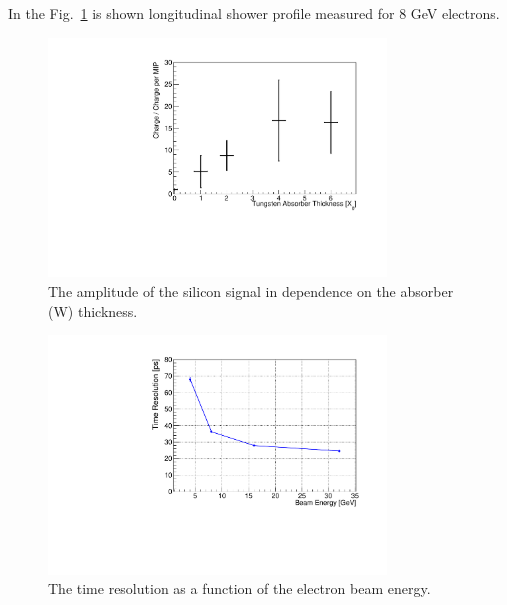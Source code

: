 \documentclass[12pt]{article}
\begin{document}
In the Fig.~\ref{fig:MIPVsAbsorberAt8GeV} is shown longitudinal shower profile
measured for 8 GeV electrons. 

\begin{figure}[htbp] 
\centering
\includegraphics[width=0.8\textwidth]{plots/MIPVsAbsorberAt8GeV.pdf} 
\caption{The amplitude of the silicon signal in dependence on the absorber (W) thickness.} 
\label{fig:MIPVsAbsorberAt8GeV} 
\end{figure} 


\begin{figure}[htbp] 
\centering
\includegraphics[width=0.8\textwidth]{plots/SigmaT_vs_BeamEnergy_lin30Stamp.pdf} 
\caption{The time resolution as a function of the electron beam energy. } 
\label{fig:SigmaT_vs_BeamEnergy_lin30Stamp} 
\end{figure} 
\end{document}
